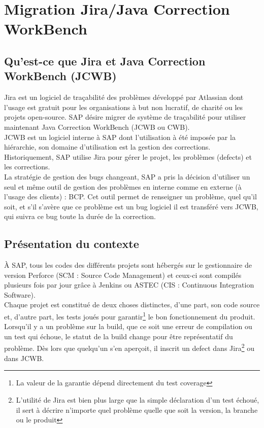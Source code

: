 \chapter{Migration Jira/Java Correction WorkBench}\label{chapitre:migration}

\section{Qu'est-ce que Jira et Java Correction WorkBench (JCWB)}
Jira est un logiciel de tra\c{c}abilit\'{e} des probl\`{e}mes d\'{e}veloppé par Atlassian dont l'usage est gratuit pour les organisations \`{a} but non lucratif, de charit\'{e} ou les projets open-source. SAP désire migrer de système de traçabilité pour utiliser maintenant Java Correction WorkBench (JCWB ou CWB).\\

JCWB est un logiciel interne à SAP dont l'utilisation à été imposée par la hiérarchie, son domaine d'utilisation est la gestion des corrections. Historiquement, SAP utilise Jira pour gérer le projet, les problèmes (defects) et les corrections.\\
La stratégie de gestion des bugs changeant, SAP a pris la décision d'utiliser un seul et même outil de gestion des problèmes en interne comme en externe (à l'usage des clients) : BCP. Cet outil permet de renseigner un problème, quel qu'il soit, et s'il s'avère que ce problème est un bug logiciel il est transféré vers JCWB, qui suivra ce bug toute la durée de la correction.




\section{Pr\'{e}sentation du contexte}


\`{A} SAP, tous les codes des différents projets sont hébergés sur le gestionnaire de version Perforce (SCM : Source Code Management)
et ceux-ci sont compilés plusieurs fois par jour grâce à Jenkins ou ASTEC (CIS : Continuous Integration Software).\\
Chaque projet est constitué de deux choses distinctes, d'une part, son code source et, d'autre part, les tests joués pour garantir\footnote{La valeur de la garantie dépend directement du test coverage} le bon fonctionnement du produit. Lorsqu'il y a un problème sur la build, que ce soit une erreur de compilation ou un test qui échoue, le statut de la build change pour être représentatif du problème. Dès lors que quelqu'un s'en aperçoit, il inscrit un defect dans Jira\footnote{L'utilité de Jira est bien plus large que la simple déclaration d'un test échoué, il sert à décrire n'importe quel problème quelle que soit la version, la branche ou le produit} ou dans JCWB.\\


